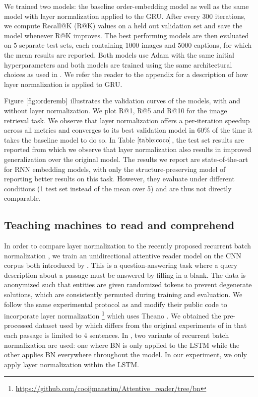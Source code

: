 We trained two models: the baseline order-embedding model as well as the same model with layer normalization applied to the GRU. After every 300 iterations, we compute Recall@K (R@K) values on a held out validation set and save the model whenever R@K improves. The best performing models are then evaluated on 5 separate test sets, each containing 1000 images and 5000 captions, for which the mean results are reported. Both models use Adam \citep{adam} with the same initial hyperparameters and both models are trained using the same architectural choices as used in \citet{vendrov2015order}. We refer the reader to the appendix for a description of how layer normalization is applied to GRU.

Figure $\ref{fig:orderemb}$ illustrates the validation curves of the models, with and without layer normalization. We plot R@1, R@5 and R@10 for the image retrieval task. We observe that layer normalization offers a per-iteration speedup across all metrics and converges to its best validation model in 60\% of the time it takes the baseline model to do so. In Table $\ref{table:coco}$, the test set results are reported from which we observe that layer normalization also results in improved generalization over the original model. The results we report are state-of-the-art for RNN embedding models, with only the structure-preserving model of \citet{wang2015learning} reporting better results on this task. However, they evaluate under different conditions (1 test set instead of the mean over 5) and are thus not directly comparable.

\subsection{Teaching machines to read and comprehend}

In order to compare layer normalization to the recently proposed recurrent batch normalization \citep{cooijmans2016recurrent}, we train an unidirectional attentive reader model on the CNN corpus both introduced by \citet{hermann2015teaching}. This is a question-answering task where a query description about a passage must be answered by filling in a blank. The data is anonymized such that entities are given randomized tokens to prevent degenerate solutions, which are consistently permuted during training and evaluation. We follow the same experimental protocol as \citet{cooijmans2016recurrent} and modify their public code to incorporate layer normalization \footnote{\url{https://github.com/cooijmanstim/Attentive_reader/tree/bn}} which uses Theano \citep{team2016theano}. We obtained the pre-processed dataset used by \citet{cooijmans2016recurrent} which differs from the original experiments of \citet{hermann2015teaching} in that each passage is limited to 4 sentences. In \citet{cooijmans2016recurrent}, two variants of recurrent batch normalization are used: one where BN is only applied to the LSTM while the other applies BN everywhere throughout the model. In our experiment, we only apply layer normalization within the LSTM.

